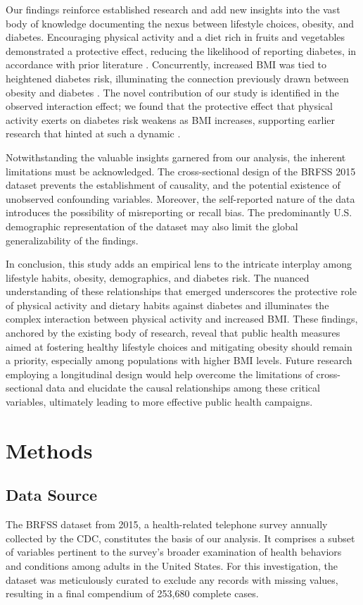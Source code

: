 \documentclass[11pt]{article}
\begin{document}
Our findings reinforce established research and add new insights into the vast body of knowledge documenting the nexus between lifestyle choices, obesity, and diabetes. Encouraging physical activity and a diet rich in fruits and vegetables demonstrated a protective effect, reducing the likelihood of reporting diabetes, in accordance with prior literature \cite{Reis2011LifestyleFA, Zeng2020PhysicalAD}. Concurrently, increased BMI was tied to heightened diabetes risk, illuminating the connection previously drawn between obesity and diabetes \cite{Chan1994ObesityFD}. The novel contribution of our study is identified in the observed interaction effect; we found that the protective effect that physical activity exerts on diabetes risk weakens as BMI increases, supporting earlier research that hinted at such a dynamic \cite{Hjerkind2017AdiposityPA}.

Notwithstanding the valuable insights garnered from our analysis, the inherent limitations must be acknowledged. The cross-sectional design of the BRFSS 2015 dataset prevents the establishment of causality, and the potential existence of unobserved confounding variables. Moreover, the self-reported nature of the data introduces the possibility of misreporting or recall bias. The predominantly U.S. demographic representation of the dataset may also limit the global generalizability of the findings.

In conclusion, this study adds an empirical lens to the intricate interplay among lifestyle habits, obesity, demographics, and diabetes risk. The nuanced understanding of these relationships that emerged underscores the protective role of physical activity and dietary habits against diabetes and illuminates the complex interaction between physical activity and increased BMI. These findings, anchored by the existing body of research, reveal that public health measures aimed at fostering healthy lifestyle choices and mitigating obesity should remain a priority, especially among populations with higher BMI levels. Future research employing a longitudinal design would help overcome the limitations of cross-sectional data and elucidate the causal relationships among these critical variables, ultimately leading to more effective public health campaigns.

\section*{Methods}

\subsection*{Data Source}
The BRFSS dataset from 2015, a health-related telephone survey annually collected by the CDC, constitutes the basis of our analysis. It comprises a subset of variables pertinent to the survey's broader examination of health behaviors and conditions among adults in the United States. For this investigation, the dataset was meticulously curated to exclude any records with missing values, resulting in a final compendium of 253,680 complete cases.
\end{document}
